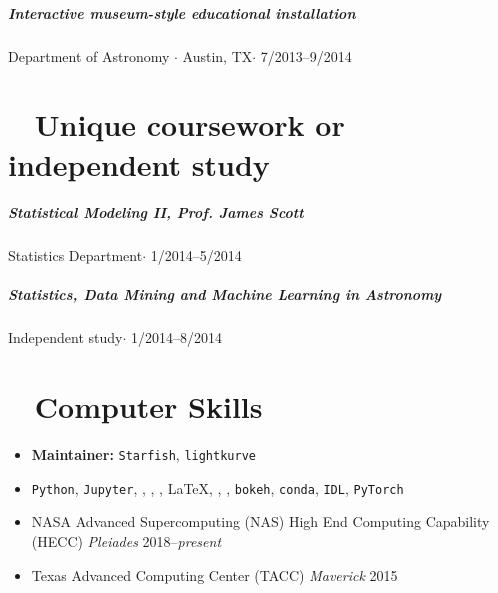 \documentclass[10pt,letterpaper]{article}
\begin{document}
\subparagraph{Interactive museum-style educational installation}
Department of Astronomy $\cdot$ Austin, TX$\cdot$ 7/2013--9/2014

\section*{ \faSuperscript ~ Unique coursework or independent study}

\subparagraph{Statistical Modeling II, Prof. James Scott}
Statistics Department$\cdot$ 1/2014--5/2014

\subparagraph{Statistics, Data Mining and Machine Learning in Astronomy}
Independent study$\cdot$ 1/2014--8/2014

\section*{ \faLaptop ~ Computer Skills}

\begin{itemize}
    \item \textbf{Maintainer:} \texttt{Starfish}, \texttt{lightkurve}
    \item \texttt{Python}, \texttt{Jupyter}, \faTerminal, \faGit, \faGithub, \LaTeX, \faApple, \faLinux, \texttt{bokeh}, \texttt{conda}, \texttt{IDL}, \texttt{PyTorch}
    \item NASA Advanced Supercomputing (NAS) High End Computing Capability (HECC) \emph{Pleiades} 2018--\emph{present}
    \item Texas Advanced Computing Center (TACC) \emph{Maverick} 2015
\end{itemize}




\end{document}
